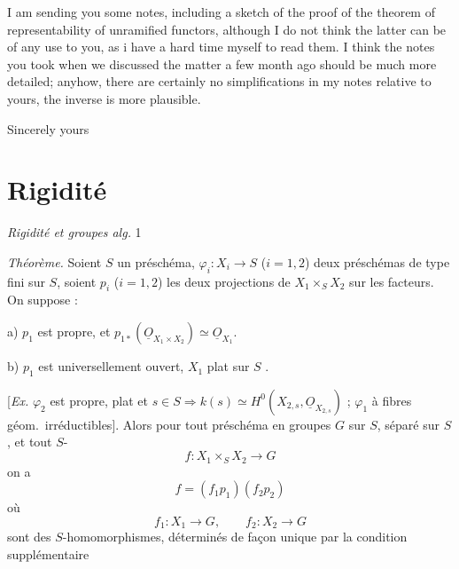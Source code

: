 \documentclass[11pt,a4paper]{article}
\begin{document}
I am sending you some notes, including a sketch of the proof of the theorem of representability of unramified functors, although I do not think the latter can be of any use to you, as i have a hard time myself to read them. I think the notes you took when we discussed the matter a few month ago should be much more detailed; anyhow, there are certainly no simplifications in my notes relative to yours, the inverse is more plausible.

Sincerely yours

\section{Rigidité}


\emph{Rigidité et groupes alg.} 1

\emph{Théorème.} Soient $S$ un préschéma, $\varphi_i \colon X_i \to S$ ($i = 1, 2$) deux préschémas  de type fini sur $S$,    soient $p_i$ ($i=1,2$) les deux projections de $X_1 \times_S X_2$ sur les facteurs. On suppose :

a) $p_1$ est propre, et $p_{1*}(\underline{O}_{X_1 \times X_2}) \simeq \underline{O}_{X_1}$.


b) $p_1$ est universellement ouvert, \struck{\ill{}} $X_1$ plat sur $S$ .

[\emph{Ex.} $\varphi_2$ est propre, plat et $s \in S \Rightarrow k(s) \simeq H^0(X_{2,s}, \underline{O}_{X_{2,s}})$ ;  $\varphi_1$  à fibres géom.\ irréductibles]. Alors pour tout préschéma en groupes $G$ sur $S$, séparé sur $S$, et tout $S$-
\[
  f \colon X_1 \times_S X_2 \longrightarrow G
\]
on a
\[
  f = (f_1 p_1)(f_2 p_2)
\]
où
\[
  f_1 \colon X_1 \to G, \qquad f_2 \colon X_2 \to G
\]
sont des $S$-homomorphismes, déterminés de façon unique par la condition supplémentaire
\end{document}
